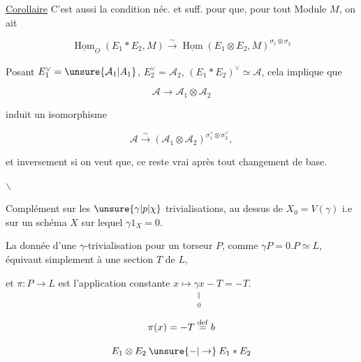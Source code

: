 

\uline{Corollaire} C'est aussi la condition néc. et suff. pour que, pour tout Module $M$, on ait

\[ \underline{\operatorname{Hom}}_{\underline O}(E_1*E_2,M)\xrightarrow{\sim}\underline{\operatorname{Hom}}(E_1\otimes E_2,M)^{\sigma_1\otimes\sigma_2} \]

Posant $E_1^\vee=\unsure{\mathcal A_1|A_1}$, $E_2^\vee=\mathcal A_2$, $(E_1*E_2)^\vee\simeq\mathcal A$, cela implique que

\[ \mathcal A\longrightarrow\mathcal A_1\otimes\mathcal A_2 \]

induit un isomorphisme

\[ \mathcal A\xrightarrow{\sim}(\mathcal A_1\otimes\mathcal A_2)^{\sigma_1^\vee\otimes\sigma_2^\vee}, \]

et inversement si on veut que, ce  reste vrai après tout changement de base.

\begin{center}$\backslash$\end{center}

Complément sur les $\unsure{\gamma|p|\chi}$ trivialisations, au dessus de $X_0=V(\gamma)$ i.e sur un schéma $X$ sur lequel $\gamma1_X=0$.

La donnée d'une $\gamma$-trivialisation pour un torseur $P$, comme $\gamma P=0.P\simeq L$, équivaut simplement à une section $T$ de $L$,

et $\pi:P\longrightarrow L$ est l'application constante $x\longmapsto\underset{\substack{\Vert\\0}}{\gamma x}-T=-T$.

\[ \pi(x)=-T\overset{\rm def}{=}b \]


\[ E_1\otimes E_2\mathbin{\unsure{-|\to}}E_1*E_2 \]
